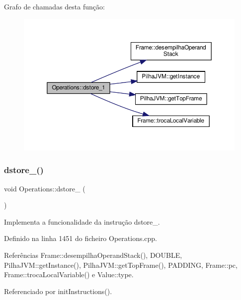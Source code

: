 Grafo de chamadas desta função\+:\nopagebreak
\begin{figure}[H]
\begin{center}
\leavevmode
\includegraphics[width=350pt]{classOperations_a5f12c99fca34f123522a6c1461782e5f_cgraph}
\end{center}
\end{figure}
\mbox{\label{classOperations_ad0f97963e6eb2482f5032fdb3465ec94}} 
\subsubsection{\texorpdfstring{dstore\+\_()}{dstore\_2()}}
{\footnotesize\ttfamily void Operations\+::dstore\+\_ (\begin{DoxyParamCaption}{ }\end{DoxyParamCaption})\hspace{0.3cm}{\ttfamily [private]}}



Implementa a funcionalidade da instrução dstore\+\_. 



Definido na linha 1451 do ficheiro Operations.\+cpp.



Referências Frame\+::desempilha\+Operand\+Stack(), D\+O\+U\+B\+LE, Pilha\+J\+V\+M\+::get\+Instance(), Pilha\+J\+V\+M\+::get\+Top\+Frame(), P\+A\+D\+D\+I\+NG, Frame\+::pc, Frame\+::troca\+Local\+Variable() e Value\+::type.



Referenciado por init\+Instructions().

